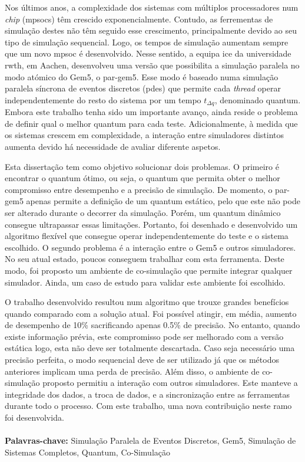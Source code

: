 
\vspace*{-0.5cm}

Nos últimos anos, a complexidade dos sistemas com múltiplos processadores num \textit{chip} (\glspl{mpsoc}) têm crescido exponencialmente. 
Contudo, as ferrementas de simulação destes não têm seguido esse crescimento, principalmente devido ao seu tipo de simulação sequencial. 
Logo, os tempos de simulação aumentam sempre que um novo \gls{mpsoc} é desenvolvido. Nesse sentido, a equipa \gls{ice} da universidade 
\gls{rwth}, em Aachen, desenvolveu uma versão que possibilita a simulação paralela no modo atómico do Gem5, o par-gem5. Esse modo é baseado 
numa simulação paralela síncrona de eventos discretos (\gls{pdes}) que permite cada \textit{thread} operar independentemente do 
resto do sistema por um tempo $t_{\Delta q}$, denominado quantum. Embora este trabalho tenha sido um importante avanço, ainda reside o problema 
de definir qual o melhor quantum para cada teste. Adicionalmente, à medida que os sistemas crescem em complexidade, a interação entre 
simuladores distintos aumenta devido há necessidade de avaliar diferente aspetos. 

Esta dissertação tem como objetivo solucionar dois problemas. O primeiro é encontrar o quantum ótimo, ou seja, o quantum que permita obter o 
melhor compromisso entre desempenho e a precisão de simulação. De momento, o par-gem5 apenas permite a definição de um quantum 
estático, pelo que este não pode ser alterado durante o decorrer da simulação. Porém, um quantum dinâmico consegue ultrapassar essas limitações. 
Portanto, foi desenhado e desenvolvido um algoritmo flexível que consegue operar independentemente do teste e o sistema escolhido. O segundo 
problema é a interação entre o Gem5 e outros simuladores. No seu atual estado, poucos conseguem trabalhar com esta ferramenta. Deste modo, foi 
proposto um ambiente de co-simulação que permite integrar qualquer simulador. Ainda, um caso de estudo para validar este ambiente foi escolhido. 

O trabalho desenvolvido resultou num algoritmo que trouxe grandes benefícios quando comparado com a solução atual. Foi possível atingir, 
em média, aumento de desempenho de 10\% sacrificando apenas 0.5\% de precisão. No entanto, quando existe informação prévia, 
este compromisso pode ser melhorado com a versão estática logo, esta não deve ser totalmente descartada. Caso seja necessário uma 
precisão perfeita, o modo sequencial deve de ser utilizado já que os métodos anteriores implicam uma perda de precisão. Além disso, o ambiente 
de co-simulação proposto permitiu a interação com outros simuladores. Este manteve a integridade dos dados, a troca de dados, e a sincronização 
entre as ferramentas durante todo o processo. Com este trabalho, uma nova contribuição neste ramo foi desenvolvida.

\paragraph{}\textbf{Palavras-chave:} Simulação Paralela de Eventos Discretos, Gem5, Simulação de Sistemas Completos, Quantum, Co-Simulação
